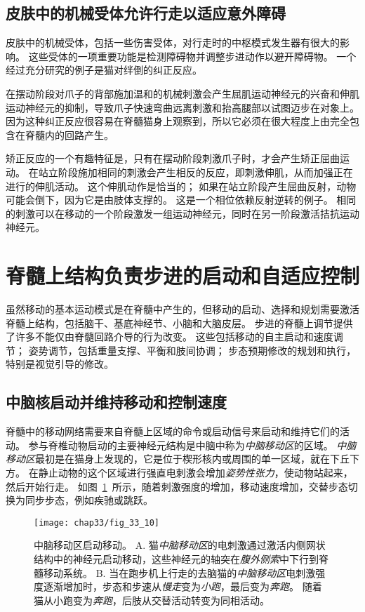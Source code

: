 \subsection{皮肤中的机械受体允许行走以适应意外障碍}

皮肤中的机械受体，包括一些伤害受体，对行走时的中枢模式发生器有很大的影响。
这些受体的一项重要功能是检测障碍物并调整步进动作以避开障碍物。
一个经过充分研究的例子是猫对绊倒的纠正反应。


在摆动阶段对爪子的背部施加温和的机械刺激会产生屈肌运动神经元的兴奋和伸肌运动神经元的抑制，导致爪子快速弯曲远离刺激和抬高腿部以试图迈步在对象上。
因为这种纠正反应很容易在脊髓猫身上观察到，所以它必须在很大程度上由完全包含在脊髓内的回路产生。


矫正反应的一个有趣特征是，只有在摆动阶段刺激爪子时，才会产生矫正屈曲运动。
在站立阶段施加相同的刺激会产生相反的反应，即刺激伸肌，从而加强正在进行的伸肌活动。
这个伸肌动作是恰当的；
如果在站立阶段产生屈曲反射，动物可能会倒下，因为它是由肢体支撑的。
这是一个相位依赖反射逆转的例子。
相同的刺激可以在移动的一个阶段激发一组运动神经元，同时在另一阶段激活拮抗运动神经元。



\section{脊髓上结构负责步进的启动和自适应控制}

虽然移动的基本运动模式是在脊髓中产生的，但移动的启动、选择和规划需要激活脊髓上结构，包括脑干、基底神经节、小脑和大脑皮层。
步进的脊髓上调节提供了许多不能仅由脊髓回路介导的行为改变。
这些包括移动的自主启动和速度调节；
姿势调节，包括重量支撑、平衡和肢间协调；
步态预期修改的规划和执行，特别是视觉引导的修改。



\subsection{中脑核启动并维持移动和控制速度}

脊髓中的移动网络需要来自脊髓上区域的命令或启动信号来启动和维持它们的活动。
参与脊椎动物启动的主要神经元结构是中脑中称为\textit{中脑移动区}的区域。
\textit{中脑移动区}最初是在猫身上发现的，它是位于楔形核内或周围的单一区域，就在下丘下方。
在静止动物的这个区域进行强直电刺激会增加\textit{姿势性张力}，使动物站起来，然后开始行走。
如图~\ref{fig:33_10}~所示，随着刺激强度的增加，移动速度增加，交替步态切换为同步步态，例如疾驰或跳跃。


\begin{figure}[htbp]
	\centering
	\texttt{[image: chap33/fig\_33\_10]}
	\caption{中脑移动区启动移动。
		A. 猫\textit{中脑移动区}的电刺激通过激活内侧网状结构中的神经元启动移动，这些神经元的轴突在\textit{腹外侧索}中下行到脊髓移动系统。
		B. 当在跑步机上行走的去脑猫的\textit{中脑移动区}电刺激强度逐渐增加时，步态和步速从\textit{慢走}变为\textit{小跑}，最后变为\textit{奔跑}。
		随着猫从小跑变为\textit{奔跑}，后肢从交替活动转变为同相活动。}
	\label{fig:33_10}
\end{figure}



